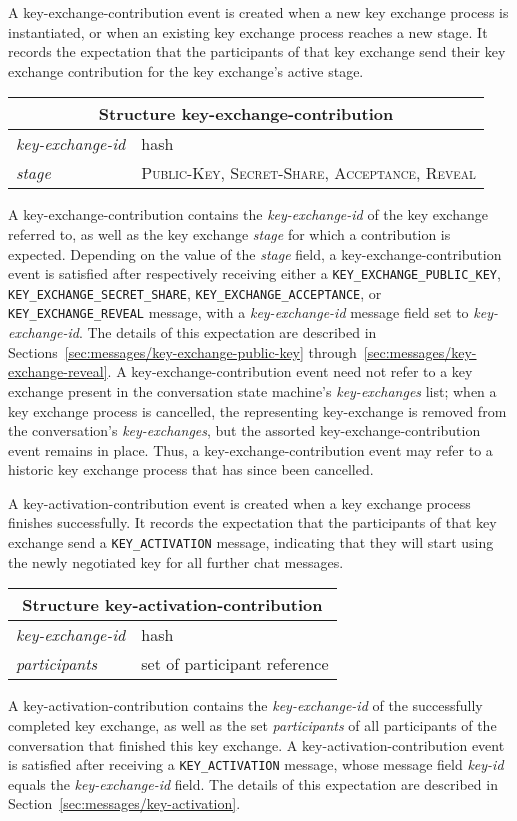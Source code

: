 \documentclass{article}
\def\message#1{\texttt{#1}}
\def\field#1{\textit{#1}}
\def\smfield#1{\textsl{#1}}
\def\type#1{\textsf{#1}}
\newenvironment{struct}[1]{
\newcommand{\structfield}[2]{
\smfield{##1} & \type{##2} \\
\hline
}
\par
\vspace{-\medskipamount}
\hspace{2em minus 2em}\begin{tabular}{|l|l|}
\hline
\multicolumn{2}{|c|}{Structure \type{#1}} \\
\hline
\hline
}{
\end{tabular}
\vspace{-\medskipamount}
\par
}
\begin{document}
A \type{key-exchange-contribution} event is created when a new key exchange process is instantiated, or when an existing key exchange process reaches a new stage.
It records the expectation that the participants of that key exchange send their key exchange contribution for the key exchange's active stage.
\begin{struct}{key-exchange-contribution}
\structfield{key-exchange-id}{hash}
\structfield{stage}{\normalfont \textsc{Public-Key}, \textsc{Secret-Share}, \textsc{Acceptance}, \textsc{Reveal}}
\end{struct}
A \type{key-exchange-contribution} contains the \smfield{key-exchange-id} of the key exchange referred to, as well as the key exchange \smfield{stage} for which a contribution is expected.
Depending on the value of the \smfield{stage} field, a \type{key-exchange-contribution} event is satisfied after respectively receiving either a \message{KEY\_EXCHANGE\_PUBLIC\_KEY}, \message{KEY\_EXCHANGE\_SECRET\_SHARE}, \message{KEY\_EXCHANGE\_ACCEPTANCE}, or \message{KEY\_EXCHANGE\_REVEAL} message, with a \field{key-exchange-id} message field set to \smfield{key-exchange-id}.
The details of this expectation are described in Sections~\ref{sec:messages/key-exchange-public-key} through~\ref{sec:messages/key-exchange-reveal}.
A \type{key-exchange-contribution} event need not refer to a key exchange present in the conversation state machine's \smfield{key-exchanges} list; when a key exchange process is cancelled, the representing \type{key-exchange} is removed from the conversation's \smfield{key-exchanges}, but the assorted \type{key-exchange-contribution} event remains in place.
Thus, a \type{key-exchange-contribution} event may refer to a historic key exchange process that has since been cancelled.

A \type{key-activation-contribution} event is created when a key exchange process finishes successfully.
It records the expectation that the participants of that key exchange send a \message{KEY\_ACTIVATION} message, indicating that they will start using the newly negotiated key for all further chat messages.
\begin{struct}{key-activation-contribution}
\structfield{key-exchange-id}{hash}
\structfield{participants}{set of participant reference}
\end{struct}
A \type{key-activation-contribution} contains the \smfield{key-exchange-id} of the successfully completed key exchange, as well as the set \smfield{participants} of all participants of the conversation that finished this key exchange.
A \type{key-activation-contribution} event is satisfied after receiving a \message{KEY\_ACTIVATION} message, whose message field \field{key-id} equals the \smfield{key-exchange-id} field.
The details of this expectation are described in Section~\ref{sec:messages/key-activation}.
\end{document}
